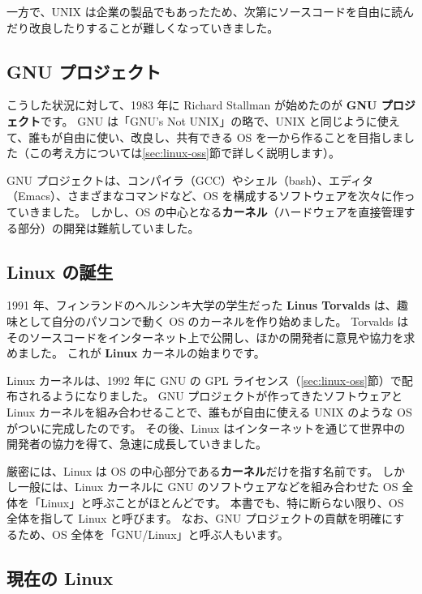 一方で、UNIX は企業の製品でもあったため、次第にソースコードを自由に読んだり改良したりすることが難しくなっていきました。

\subsection{GNU プロジェクト}

こうした状況に対して、1983 年に Richard Stallman が始めたのが \textbf{GNU プロジェクト}です。
GNU は「GNU's Not UNIX」の略で、UNIX と同じように使えて、誰もが自由に使い、改良し、共有できる OS を一から作ることを目指しました（この考え方については\ref{sec:linux-oss}節で詳しく説明します）。

GNU プロジェクトは、コンパイラ（GCC）やシェル（bash）、エディタ（Emacs）、さまざまなコマンドなど、OS を構成するソフトウェアを次々に作っていきました。
しかし、OS の中心となる\textbf{カーネル}（ハードウェアを直接管理する部分）の開発は難航していました。

\subsection{Linux の誕生}

1991 年、フィンランドのヘルシンキ大学の学生だった \textbf{Linus Torvalds} は、趣味として自分のパソコンで動く OS のカーネルを作り始めました。
Torvalds はそのソースコードをインターネット上で公開し、ほかの開発者に意見や協力を求めました。
これが \textbf{Linux} カーネルの始まりです。

Linux カーネルは、1992 年に GNU の GPL ライセンス（\ref{sec:linux-oss}節）で配布されるようになりました。
GNU プロジェクトが作ってきたソフトウェアと Linux カーネルを組み合わせることで、誰もが自由に使える UNIX のような OS がついに完成したのです。
その後、Linux はインターネットを通じて世界中の開発者の協力を得て、急速に成長していきました。

\begin{point}
  厳密には、Linux は OS の中心部分である\textbf{カーネル}だけを指す名前です。
  しかし一般には、Linux カーネルに GNU のソフトウェアなどを組み合わせた OS 全体を「Linux」と呼ぶことがほとんどです。
  本書でも、特に断らない限り、OS 全体を指して Linux と呼びます。
  なお、GNU プロジェクトの貢献を明確にするため、OS 全体を「GNU/Linux」と呼ぶ人もいます。
\end{point}

\subsection{現在の Linux}

